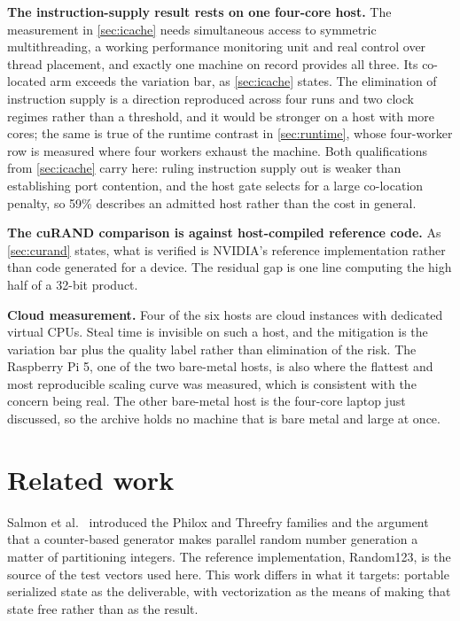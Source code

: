 \documentclass[acmsmall,screen,review]{acmart}
\theoremstyle{acmdefinition}
\begin{document}
\textbf{The instruction-supply result rests on one four-core host.} The
measurement in \cref{sec:icache} needs simultaneous access to symmetric
multithreading, a working performance monitoring unit and real control over
thread placement, and exactly one machine on record provides all three. Its
co-located arm exceeds the variation bar, as \cref{sec:icache} states. The
elimination of instruction supply is a direction reproduced across four runs and
two clock regimes rather than a threshold, and it would be stronger on a host
with more cores; the same is true of the runtime contrast in \cref{sec:runtime},
whose four-worker row is measured where four workers exhaust the machine. Both
qualifications from \cref{sec:icache} carry here: ruling instruction supply out
is weaker than establishing port contention, and the host gate selects for a
large co-location penalty, so 59\% describes an admitted host rather than the
cost in general.

\textbf{The cuRAND comparison is against host-compiled reference code.} As
\cref{sec:curand} states, what is verified is NVIDIA's reference implementation
rather than code generated for a device. The residual gap is one line computing
the high half of a 32-bit product.

\textbf{Cloud measurement.} Four of the six hosts are cloud instances with
dedicated virtual CPUs. Steal time is invisible on such a host, and the
mitigation is the variation bar plus the quality label rather than elimination
of the risk. The Raspberry Pi 5, one of the two bare-metal hosts, is also where
the flattest and most reproducible scaling curve was measured, which is
consistent with the concern being real. The other bare-metal host is the
four-core laptop just discussed, so the archive holds no machine that is bare
metal and large at once.

\section{Related work}\label{sec:related}

Salmon et al.~\cite{salmon2011} introduced the Philox and Threefry families and
the argument that a counter-based generator makes parallel random number
generation a matter of partitioning integers. The reference implementation,
Random123, is the source of the test vectors used here. This work differs in
what it targets: portable serialized state as the deliverable, with
vectorization as the means of making that state free rather than as the result.
\end{document}
